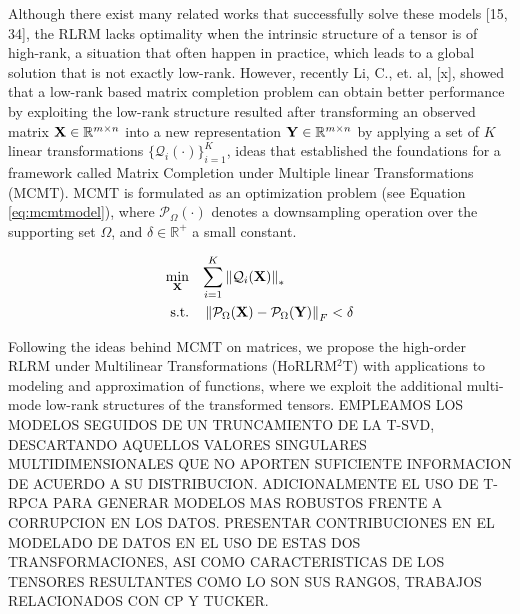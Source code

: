 \documentclass[sensors,article,submit,moreauthors,pdftex]{Definitions/mdpi}
\newcommand{\mathmat}[1]{\boldsymbol{\mathbf{\MakeUppercase{#1}}}}
\begin{document}
Although there exist many related works that successfully solve these models [15, 34], the RLRM lacks optimality when the intrinsic structure of a tensor is of high-rank, a situation that often happen in practice, which leads to a global solution that is not exactly low-rank. However, recently Li, C., et. al, [x], showed that a low-rank based matrix completion problem can obtain better performance by exploiting the low-rank structure resulted after transforming an observed matrix $\mathmat{X}\in\mathbb{R}^{m \times n}$ into a new representation $\mathmat{Y}\in\mathbb{R}^{m \times n}$ by applying a set of $K$ linear transformations $\{\mathcal{Q}_i(\cdot)\}_{i=1}^K$, ideas that established the foundations for a framework called Matrix Completion under Multiple linear Transformations (MCMT). MCMT is formulated as an optimization problem (see Equation \ref{eq:mcmtmodel}), where $\mathcal{P}_\Omega(\cdot)$ denotes a downsampling operation over the supporting set $\Omega$, and $\delta\in\mathbb{R}^+$ a small constant.

\begin{equation}
	\begin{aligned}
		\min_{\mathmat{X}} \quad & {\sum_{i=1}^{K} \left\lVert \mathcal{Q}_i(\mathmat{X}) \right\rVert_*}\\
		\textrm{s.t.} \quad & \left\lVert \mathcal{P}_\Omega(\mathmat{X}) - \mathcal{P}_\Omega(\mathmat{Y}) \right\rVert_F < \delta
	\end{aligned}
\label{eq:mcmtmodel}
\end{equation}

Following the ideas behind MCMT on matrices, we propose the high-order RLRM under Multilinear Transformations (HoRLRM$^2$T) with applications to modeling and approximation of functions, where we exploit the additional multi-mode low-rank structures of the transformed tensors.
EMPLEAMOS LOS MODELOS SEGUIDOS DE UN TRUNCAMIENTO DE LA T-SVD, DESCARTANDO AQUELLOS VALORES SINGULARES MULTIDIMENSIONALES QUE NO APORTEN SUFICIENTE INFORMACION DE ACUERDO A SU DISTRIBUCION. ADICIONALMENTE EL USO DE T-RPCA PARA GENERAR MODELOS MAS ROBUSTOS FRENTE A CORRUPCION EN LOS DATOS.
PRESENTAR CONTRIBUCIONES EN EL MODELADO DE DATOS EN EL USO DE ESTAS DOS TRANSFORMACIONES, ASI COMO CARACTERISTICAS DE LOS TENSORES RESULTANTES COMO LO SON SUS RANGOS, TRABAJOS RELACIONADOS CON CP Y TUCKER.






\end{document}
